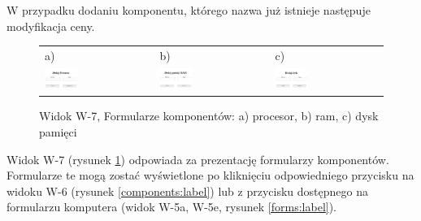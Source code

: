 W przypadku dodaniu komponentu, którego nazwa już istnieje następuje modyfikacja ceny.

\begin{figure}[htb]
  \centering
	\begin{tabular}{@{}lll@{}}
	a) & b) & c) \\
  \includegraphics[width=0.31\textwidth]{rys05/view/addProc.pdf} & 
	\includegraphics[width=0.31\textwidth]{rys05/view/addRam.pdf} &
	\includegraphics[width=0.31\textwidth]{rys05/view/addStorage.pdf}
	\end{tabular}
  \caption{Widok W-7, Formularze komponentów: a) procesor, b) ram, c) dysk pamięci}
  \label{compforms:label}
\end{figure}

Widok W-7 (rysunek \ref{compforms:label}) odpowiada za prezentację formularzy komponentów. Formularze te mogą zostać wyświetlone po kliknięciu odpowiedniego przycisku na widoku W-6 (rysunek \ref{components:label}) lub z przycisku dostępnego na formularzu komputera (widok W-5a, W-5e, rysunek \ref{forms:label}).



